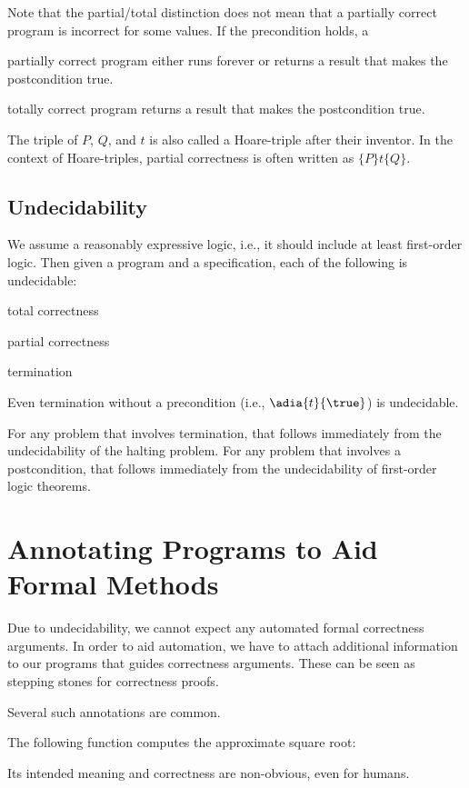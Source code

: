 Note that the partial/total distinction does not mean that a partially correct program is incorrect for some values.
If the precondition holds, a
\begin{compactitem}
 \item partially correct program either runs forever or returns a result that makes the postcondition true.
 \item totally correct program returns a result that makes the postcondition true.
\end{compactitem}


The triple of $P$, $Q$, and $t$ is also called a Hoare-triple after their inventor. %
In the context of Hoare-triples, partial correctness is often written as $\{P\}t\{Q\}$.

\subsection{Undecidability}

We assume a reasonably expressive logic, i.e., it should include at least first-order logic.
Then given a program and a specification, each of the following is undecidable:
\begin{compactitem}
 \item total correctness
 \item partial correctness
 \item termination
\end{compactitem}
Even termination without a precondition (i.e., $\adia{t}{\true}$) is undecidable.

For any problem that involves termination, that follows immediately from the undecidability of the halting problem.
For any problem that involves a postcondition, that follows immediately from the undecidability of first-order logic theorems.

\section{Annotating Programs to Aid Formal Methods}

Due to undecidability, we cannot expect any automated formal correctness arguments.
In order to aid automation, we have to attach additional information to our programs that guides correctness arguments.
These can be seen as stepping stones for correctness proofs.

Several such annotations are common.

\begin{example}\label{ex:sd:sqrt}
The following function computes the approximate square root:
\begin{acode}
\end{acode}
Its intended meaning and correctness are non-obvious, even for humans.
\end{example}

